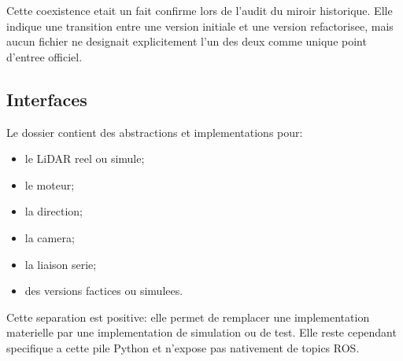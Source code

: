 Cette coexistence etait un fait confirme lors de l'audit du miroir historique. Elle indique une transition entre une version initiale et une version refactorisee, mais aucun fichier ne designait explicitement l'un des deux comme unique point d'entree officiel.

\subsection{Interfaces}

Le dossier  contient des abstractions et implementations pour:

\begin{itemize}
  \item le LiDAR reel ou simule;
  \item le moteur;
  \item la direction;
  \item la camera;
  \item la liaison serie;
  \item des versions factices ou simulees.
\end{itemize}

Cette separation est positive: elle permet de remplacer une implementation materielle par une implementation de simulation ou de test. Elle reste cependant specifique a cette pile Python et n'expose pas nativement de topics ROS.
